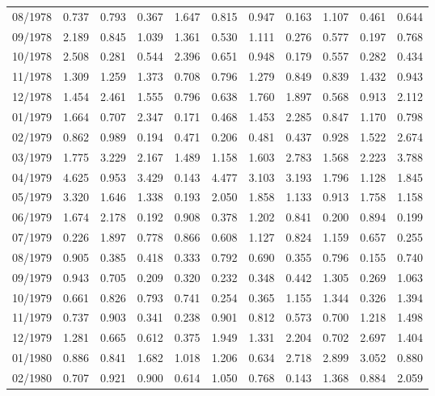\begin{tabular}{lrrrrrrrrrr}
08/1978 &  0.737 &  0.793 &  0.367 &  1.647 &  0.815 &  0.947 &  0.163 &  1.107 &  0.461 &  0.644 \\
09/1978 &  2.189 &  0.845 &  1.039 &  1.361 &  0.530 &  1.111 &  0.276 &  0.577 &  0.197 &  0.768 \\
10/1978 &  2.508 &  0.281 &  0.544 &  2.396 &  0.651 &  0.948 &  0.179 &  0.557 &  0.282 &  0.434 \\
11/1978 &  1.309 &  1.259 &  1.373 &  0.708 &  0.796 &  1.279 &  0.849 &  0.839 &  1.432 &  0.943 \\
12/1978 &  1.454 &  2.461 &  1.555 &  0.796 &  0.638 &  1.760 &  1.897 &  0.568 &  0.913 &  2.112 \\
01/1979 &  1.664 &  0.707 &  2.347 &  0.171 &  0.468 &  1.453 &  2.285 &  0.847 &  1.170 &  0.798 \\
02/1979 &  0.862 &  0.989 &  0.194 &  0.471 &  0.206 &  0.481 &  0.437 &  0.928 &  1.522 &  2.674 \\
03/1979 &  1.775 &  3.229 &  2.167 &  1.489 &  1.158 &  1.603 &  2.783 &  1.568 &  2.223 &  3.788 \\
04/1979 &  4.625 &  0.953 &  3.429 &  0.143 &  4.477 &  3.103 &  3.193 &  1.796 &  1.128 &  1.845 \\
05/1979 &  3.320 &  1.646 &  1.338 &  0.193 &  2.050 &  1.858 &  1.133 &  0.913 &  1.758 &  1.158 \\
06/1979 &  1.674 &  2.178 &  0.192 &  0.908 &  0.378 &  1.202 &  0.841 &  0.200 &  0.894 &  0.199 \\
07/1979 &  0.226 &  1.897 &  0.778 &  0.866 &  0.608 &  1.127 &  0.824 &  1.159 &  0.657 &  0.255 \\
08/1979 &  0.905 &  0.385 &  0.418 &  0.333 &  0.792 &  0.690 &  0.355 &  0.796 &  0.155 &  0.740 \\
09/1979 &  0.943 &  0.705 &  0.209 &  0.320 &  0.232 &  0.348 &  0.442 &  1.305 &  0.269 &  1.063 \\
10/1979 &  0.661 &  0.826 &  0.793 &  0.741 &  0.254 &  0.365 &  1.155 &  1.344 &  0.326 &  1.394 \\
11/1979 &  0.737 &  0.903 &  0.341 &  0.238 &  0.901 &  0.812 &  0.573 &  0.700 &  1.218 &  1.498 \\
12/1979 &  1.281 &  0.665 &  0.612 &  0.375 &  1.949 &  1.331 &  2.204 &  0.702 &  2.697 &  1.404 \\
01/1980 &  0.886 &  0.841 &  1.682 &  1.018 &  1.206 &  0.634 &  2.718 &  2.899 &  3.052 &  0.880 \\
02/1980 &  0.707 &  0.921 &  0.900 &  0.614 &  1.050 &  0.768 &  0.143 &  1.368 &  0.884 &  2.059 \\

\end{tabular}
